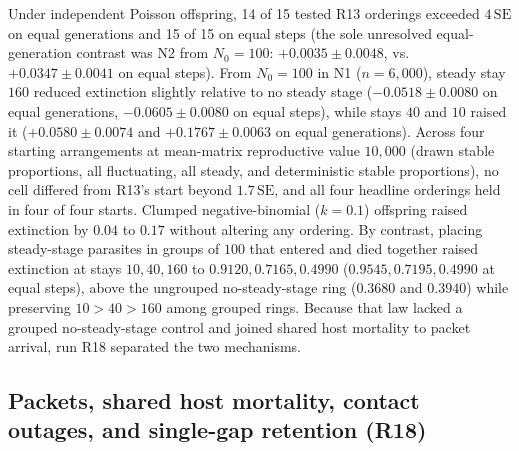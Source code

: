 Under independent Poisson offspring, 14 of 15 tested R13 orderings exceeded $4\,\mathrm{SE}$ on equal generations and 15 of 15 on equal steps (the sole unresolved equal-generation contrast was N2 from $N_0 = 100$: $+0.0035 \pm 0.0048$, vs.\ $+0.0347 \pm 0.0041$ on equal steps). From $N_0 = 100$ in N1 ($n = 6{,}000$), steady stay $160$ reduced extinction slightly relative to no steady stage ($-0.0518 \pm 0.0080$ on equal generations, $-0.0605 \pm 0.0080$ on equal steps), while stays $40$ and $10$ raised it ($+0.0580 \pm 0.0074$ and $+0.1767 \pm 0.0063$ on equal generations). Across four starting arrangements at mean-matrix reproductive value $10{,}000$ (drawn stable proportions, all fluctuating, all steady, and deterministic stable proportions), no cell differed from R13's start beyond $1.7\,\mathrm{SE}$, and all four headline orderings held in four of four starts. Clumped negative-binomial ($k = 0.1$) offspring raised extinction by $0.04$ to $0.17$ without altering any ordering. By contrast, placing steady-stage parasites in groups of $100$ that entered and died together raised extinction at stays $10, 40, 160$ to $0.9120, 0.7165, 0.4990$ ($0.9545, 0.7195, 0.4990$ at equal steps), above the ungrouped no-steady-stage ring ($0.3680$ and $0.3940$) while preserving $10 > 40 > 160$ among grouped rings. Because that law lacked a grouped no-steady-stage control and joined shared host mortality to packet arrival, run R18 separated the two mechanisms.

\subsection{Packets, shared host mortality, contact outages, and single-gap retention (R18)}\label{num-esm-r18}

